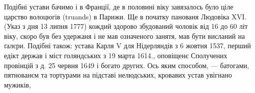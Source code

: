Подібні устави бачимо і в Франції, де в половині 
віку завязалось було ціле царство волоцюгів (truands) в Парижи.
Ще в початку панованя Людовіка XVI. (Указ з дня
13 липня 1777) кождий здорово збудований чоловік від 16
до 60 літ віку, скоро був без удержаня і не мав означеного
занятя, мав бути висланий на ґалєри. Подібні також: устава
Карля V для Нідерляндів з 6 жовтня 1537, перший едікт
держав і міст голяндських з 19 марта 1614., оповіщенє Сполучених
провінцій з д. 25 червня 1649 і богато других.
Ось яким способом, — батогами, пятнованєм та тортурами
на підставі нелюдських, кровавих устав увігнано мужиків,
\parbreak{}
